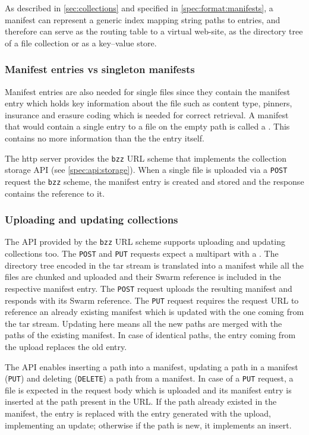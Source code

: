 As described in \ref{sec:collections} and specified in \ref{spec:format:manifests}, a manifest can represent a generic index mapping string paths to entries, and therefore can serve as the routing table to a virtual web-site, as the directory tree of a file collection or as a key--value store. 

\subsubsection{Manifest entries vs singleton manifests}

Manifest entries are also needed for single files since they contain the manifest entry which holds key information about the file such as content type, pinners, insurance and erasure coding which is needed for correct retrieval. A manifest that would contain a single entry to a file on  the empty path is called a . This contains no more information than the the entry itself.  

The http server provides the \lstinline{bzz} URL scheme that implements the collection storage API (see  \ref{spec:api:storage}). When a single file is uploaded via a \lstinline{POST} request the \lstinline{bzz} scheme, the manifest entry is created and stored and the response contains the reference to it.

\subsubsection{Uploading and updating collections}

The API provided by the \lstinline{bzz} URL scheme supports uploading and updating collections too. The \lstinline{POST} and \lstinline{PUT} requests expect a multipart with a . The directory tree encoded in the tar stream is translated into a manifest while all the files are chunked and uploaded and their Swarm reference is included in the respective manifest entry. The \lstinline{POST} request uploads the resulting manifest and responds with its Swarm reference. The \lstinline{PUT} request requires the request URL to reference an already existing manifest which is updated with the one coming from the tar stream. Updating here means all the new paths are merged with the paths of the existing manifest. In case of identical paths, the entry coming from the upload replaces the old entry.

The API enables inserting a path into a manifest, updating a path in a manifest (\lstinline{PUT}) and deleting (\lstinline{DELETE}) a path from a manifest. In case of a \lstinline{PUT} request, a file is expected in the request body which is uploaded and its manifest entry is inserted at the path present in the URL. If the path already existed in the manifest, the entry is replaced with the entry generated with the upload, implementing an update; otherwise if the path is new, it implements an insert. 

